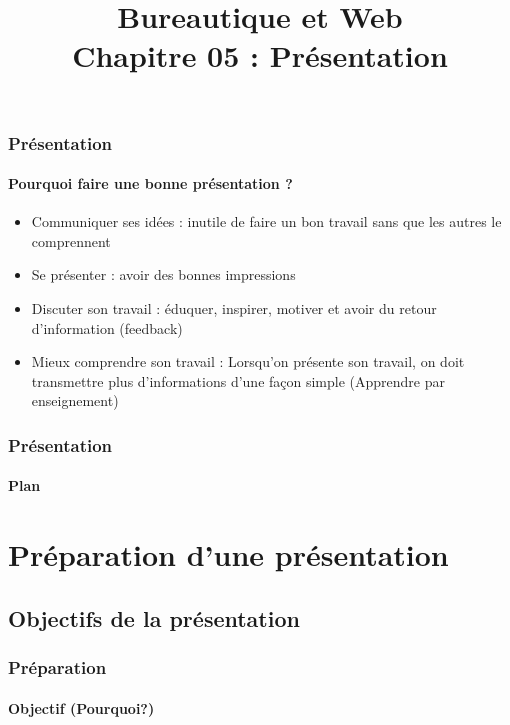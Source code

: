 \documentclass[xcolor=table, usenames,dvipsnames]{beamer}
\title[BWEB : 05- Présentation] %
{Bureautique et Web \\Chapitre 05 : Présentation}
\begin{document}
\begin{frame}

\frametitle{Présentation}
\framesubtitle{Pourquoi faire une bonne présentation ?}
	
	\begin{itemize}
		\item Communiquer ses idées : inutile de faire un bon travail sans que les autres le comprennent
		\item Se présenter : avoir des bonnes impressions 
		\item Discuter son travail : éduquer, inspirer, motiver et avoir du retour d'information (feedback)
		\item Mieux comprendre son travail : Lorsqu'on présente son travail, on doit transmettre plus d'informations d'une façon simple (Apprendre par enseignement)
	\end{itemize}
\end{frame}

\begin{frame}
\frametitle{Présentation}
\framesubtitle{Plan}

\begin{multicols}{2}
	\tableofcontents
\end{multicols}
\end{frame}

\section{Préparation d'une présentation}

\subsection{Objectifs de la présentation}

\begin{frame}
\frametitle{Préparation}
\framesubtitle{Objectif (Pourquoi?)}


\end{frame}
\end{document}

